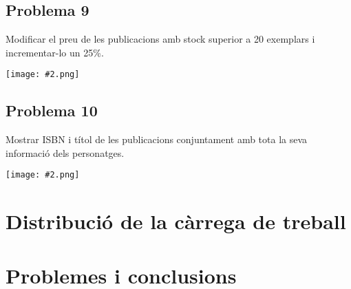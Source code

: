 \documentclass{article}
\newcommand{\imatge}[2]{
\begin{center}
    \texttt{[image: \#2.png]}
\end{center}
}
\begin{document}
\subsection*{Problema 9}
Modificar el preu de les publicacions amb stock superior a 20 exemplars i incrementar-lo un 25\%.
\imatge{1}{9}
\subsection*{Problema 10}
Mostrar ISBN i títol de les publicacions conjuntament amb tota la seva informació dels personatges.
\imatge{1}{10}

\section{Distribuci\'o de la c\`arrega de treball}

\section{Problemes i conclusions}
\end{document}
